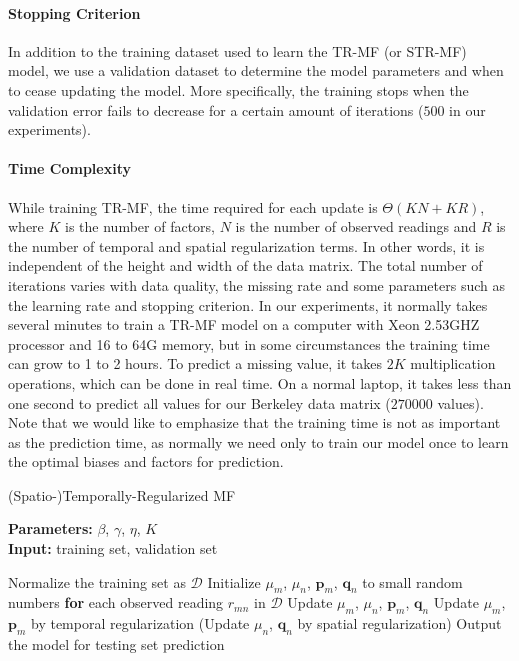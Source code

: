 \paragraph*{Stopping Criterion}
In addition to the training dataset used to learn the TR-MF (or STR-MF) model, we use a validation 
dataset to determine the model parameters and when to cease updating the model. 
More specifically, the training stops when the validation error fails to decrease for a certain 
amount of iterations ($500$ in our experiments). 

\paragraph*{Time Complexity}
While training TR-MF, the time required for each update is $\Theta(KN + KR)$, where $K$ is the number of factors, $N$ is the number of observed readings and $R$ is the number of temporal and spatial regularization terms.
In other words, it is independent of the height and width of the data matrix. 
The total number of iterations varies with data quality, the missing rate and some parameters such as the learning rate and stopping criterion.
In our experiments, it normally takes several minutes to train a TR-MF model on a computer with Xeon 2.53GHZ processor and 16 to 64G memory, but in some circumstances the training time can grow to 1 to 2 hours.
To predict a missing value, it takes $2K$ multiplication operations, which can be done in real time. 
On a normal laptop, it takes less than one second to predict all values for our Berkeley data matrix ($270000$ values).
Note that we would like to emphasize that the training time is not as important as the prediction time, as normally we need only to train our model once to learn the optimal biases and factors for prediction.

\begin{algorithm}
	\caption{(Spatio-)Temporally-Regularized MF}
	\label{alg:STRMF}
	\textbf{Parameters:} $\beta$, $\gamma$, $\eta$, $K$\\
	\textbf{Input:} training set, validation set
	\begin{algorithmic}
		\State Normalize the training set as $\mathcal{D}$
		\State Initialize $\mu_m$, $\mu_n$, $\mathbf{p}_m$, $\mathbf{q}_n$ to small random numbers
		\Repeat
			\State \textbf{for} each observed reading $r_{mn}$ in $\mathcal{D}$
				\State \indent Update $\mu_m$, $\mu_n$, $\mathbf{p}_{m}$, $\mathbf{q}_{n}$
			\State Update $\mu_m$, $\mathbf{p}_m$ by temporal regularization
			\State (Update $\mu_n$, $\mathbf{q}_n$ by spatial regularization)
		\State Output the model for testing set prediction
	\end{algorithmic}
\end{algorithm}
